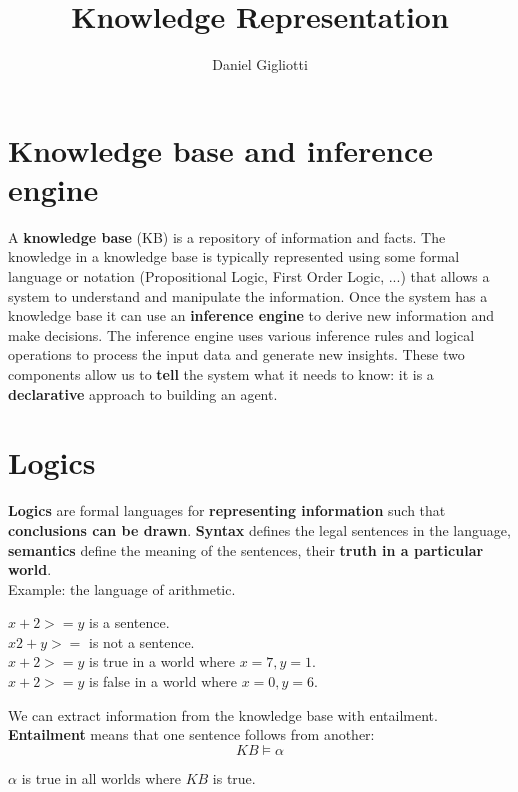 \documentclass{article}
\title{Knowledge Representation}
\author{Daniel Gigliotti}
\date{}
\begin{document}
\maketitle

\section{Knowledge base and inference engine}

A \textbf{knowledge base} (KB) is a repository of information and facts. The knowledge in a knowledge base is typically represented using some formal language or notation (Propositional Logic, First Order Logic, ...) that allows a system to understand and manipulate the information. Once the system has a knowledge base it can use an \textbf{inference engine} to derive new information and make decisions. The inference engine uses various inference rules and logical operations to process the input data and generate new insights. These two components allow us to \textbf{tell} the system what it needs to know: it is a \textbf{declarative} approach to building an agent. \\

\section{Logics}

\textbf{Logics} are formal languages for \textbf{representing information} such that \textbf{conclusions can be drawn}.
\textbf{Syntax} defines the legal sentences in the language, \textbf{semantics} define the meaning of the sentences, their \textbf{truth in a particular world}. \\

Example: the language of arithmetic.
\begin{center}
    $x + 2 >= y$ is a sentence.\\
    $x2 + y >= $ is not  a sentence. \\
    $x + 2 >= y$ is true in a world where $x = 7, y = 1$. \\
    $x + 2 >= y$ is false in a world where $x = 0, y = 6$. \\
\end{center}

We can extract information from the knowledge base with entailment. \textbf{Entailment} means that one sentence follows from another:
\begin{equation*}
    KB \models \alpha
\end{equation*}
\begin{center}
    $\alpha$ is true in all worlds where $KB$ is true.    
\end{center}\newpage
\end{document}
